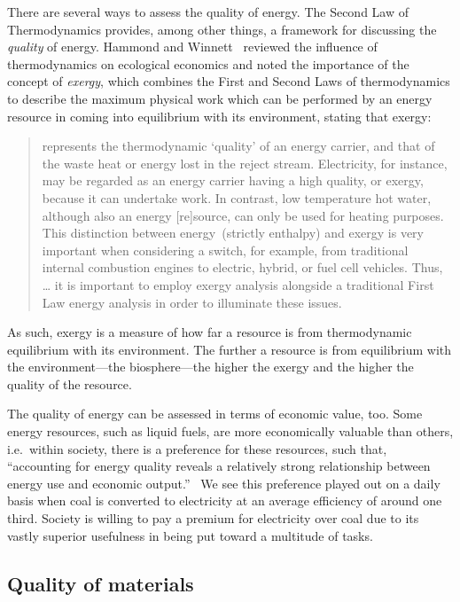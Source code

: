 There are several ways to assess the quality of energy.
The Second Law of Thermodynamics provides, 
among other things,
a framework for discussing the \emph{quality} of energy.
Hammond and Winnett~\cite{Hammond:2009tu} reviewed
the influence of thermodynamics on ecological economics 
and noted the importance of the concept of \emph{exergy},
which combines the First and Second Laws of thermodynamics
to describe the maximum physical work 
which can be performed by an energy resource
in coming into equilibrium with its environment,
stating that exergy:

\begin{quote}
	represents the thermodynamic `quality' 
	of an energy carrier, 
	and that of the waste heat or energy lost in the reject stream. 
	Electricity, for instance, 
	may be regarded as an energy carrier having a high quality, 
	or exergy, because it can undertake work. 
	In contrast, low temperature hot water, 
	although also an energy [re]source, 
	can only be used for heating purposes. 
	This distinction between energy~(strictly enthalpy) 
	and exergy is very important 
	when considering a switch, for example, 
	from traditional internal combustion engines 
	to electric, hybrid, or fuel cell vehicles. 
	Thus, \ldots{} it is important to employ exergy analysis 
	alongside a traditional First Law energy analysis 
	in order to illuminate these issues.
\end{quote}

As such, exergy is a measure of how far a resource
is from thermodynamic equilibrium with its environment.
The further a resource is from equilibrium with the 
environment---the biosphere---the
higher the exergy and the higher the quality of the resource.

The quality of energy can be assessed in terms of economic value, too.
Some energy resources, such as liquid fuels, 
are more economically valuable than others,
i.e.\ within society, there is a preference for these resources,
such that, ``accounting for energy quality reveals a relatively strong relationship 
between energy use and economic output.''~\cite[p. 313]{Cleveland2000}
We see this preference played out on a daily basis
when coal is converted to electricity at 
an average efficiency of around one third.
Society is willing to pay a premium for electricity
over coal due to its vastly superior usefulness in
being put toward a multitude of tasks.

\subsection{Quality of materials}
\label{sec:material_quality}

